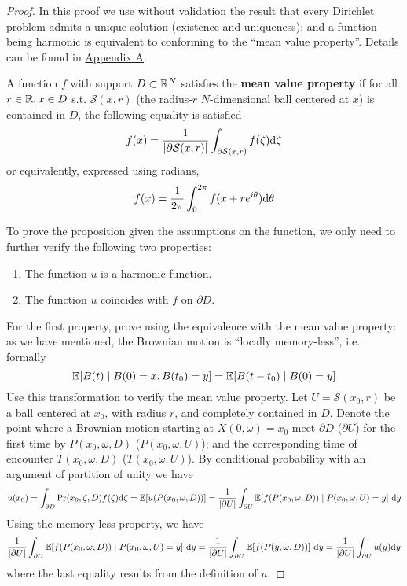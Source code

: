 \documentclass[10pt]{article}
\begin{document}
\begin{proof}
    In this proof we use without validation the result that every Dirichlet problem admits a unique solution (existence and uniqueness); and a function being harmonic is equivalent to conforming to the ``mean value property''. Details can be found in \hyperref[appendix A]{Appendix A}.

    \begin{paraindent}
        \begin{definition}\label{def: mean value property}
            A function $f$ with support $D \subset \mathbb{R}^N$ satisfies the \textbf{mean value property} if for all $r \in \mathbb{R}, x \in D$ s.t. $\mathcal{S}(x, r)$ (the radius-$r$ $N$-dimensional ball centered at $x$) is contained in $D$, the following equality is satisfied
            \[
                f(x) = \frac{1}{\left|\partial \mathcal{S}(x, r)\right|}\int_{\partial \mathcal{S}(x, r)} f(\zeta) \mathrm{d} \zeta
            \]
            or equivalently, expressed using radians,
            \[
                f(x) = \frac{1}{2 \pi} \int_0^{2\pi} f(x + r e^{i \theta}) \mathrm{d} \theta 
            \]
        \end{definition}
    \end{paraindent}

    To prove the proposition given the assumptions on the function, we only need to further verify the following two properties:
    \begin{enumerate}
        \item The function $u$ is a harmonic function.
        \item The function $u$ coincides with $f$ on $\partial D$.
    \end{enumerate}

    For the first property, prove using the equivalence with the mean value property: as we have mentioned, the Brownian motion is ``locally memory-less'', i.e. formally
    \[
        \mathbb{E}[B(t) \mid B(0) = x, B(t_0) = y] = \mathbb{E}[B(t - t_0) \mid B(0) = y]
    \]
    Use this transformation to verify the mean value property. Let $U = \mathcal{S}(x_0, r)$ be a ball centered at $x_0$, with radius $r$, and completely contained in $D$. Denote the point where a Brownian motion starting at $X(0, \omega) = x_0$ meet $\partial D$ ($\partial U$) for the first time by $P(x_0, \omega, D)$ ($P(x_0, \omega, U)$); and the corresponding time of encounter $T(x_0, \omega, D)$ ($T(x_0, \omega, U)$). By conditional probability with an argument of partition of unity we have
    \[
        u(x_0) = \int_{\partial D} \mathrm{Pr}(x_0, \zeta, D) f(\zeta) \mathrm{d} \zeta = \mathbb{E}[u(P(x_0, \omega, D))] = \frac{1}{\left|\partial U\right|} \int_{\partial U} \mathbb{E}[f(P(x_0, \omega, D)) \mid P(x_0, \omega, U) = y]\ \mathrm{d} y
    \]
    Using the memory-less property, we have
    \[
        \frac{1}{\left|\partial U\right|} \int_{\partial U} \mathbb{E}[f(P(x_0, \omega, D)) \mid P(x_0, \omega, U) = y]\ \mathrm{d} y = \frac{1}{\left|\partial U\right|} \int_{\partial U} \mathbb{E}[ f(P(y, \omega, D)) ]\ \mathrm{d} y = \frac{1}{\left|\partial U\right|} \int_{\partial U} u(y) \mathrm{d} y
    \]
    where the last equality results from the definition of $u$. 


\end{proof}
\end{document}
